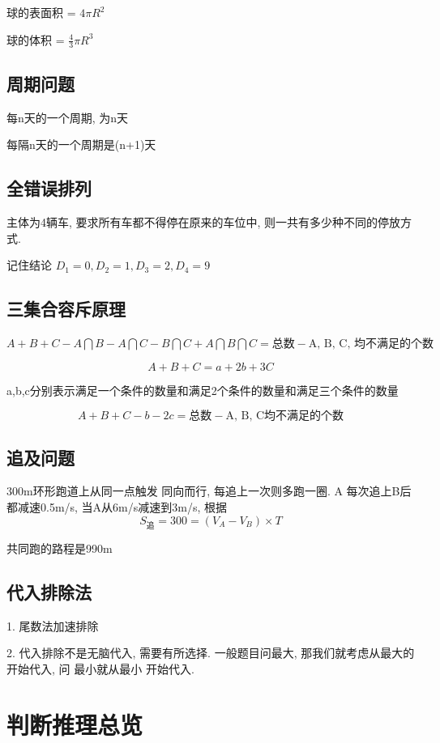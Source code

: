 \documentclass[UTF8]{ctexart}
\begin{document}
球的表面积 = $4\pi R^2$

球的体积 = $\frac{4}{3} \pi R^3$

\subsection{周期问题}
每n天的一个周期, 为n天

每隔n天的一个周期是(n+1)天




\subsection{全错误排列}

主体为4辆车, 要求所有车都不得停在原来的车位中, 则一共有多少种不同的停放方式.

记住结论 $D_1 = 0, D_2 = 1, D_3 = 2, D_4 = 9$


\subsection{三集合容斥原理}

$A + B + C - A\bigcap B - A \bigcap C - B \bigcap C + A \bigcap B \bigcap C = \mbox{总数} - \mbox{A, B, C, 均不满足的个数} $

$$A + B + C = a + 2b + 3C$$

a,b,c分别表示满足一个条件的数量和满足2个条件的数量和满足三个条件的数量

$$
	A + B + C - b - 2c = \mbox{总数} - \mbox{A, B, C均不满足的个数}
$$


\subsection{追及问题}

300m环形跑道上从同一点触发 同向而行, 每追上一次则多跑一圈. A 每次追上B后都减速0.5m/s, 当A从6m/s减速到3m/s,
根据
$$
	S_{追} = 300 = (V_A - V_B) \times T
$$

共同跑的路程是990m

\subsection{代入排除法}
1. 尾数法加速排除

2. 代入排除不是无脑代入, 需要有所选择. 一般题目问最大, 那我们就考虑从最大的开始代入, 问
最小就从最小 开始代入.
\section{判断推理总览}
\end{document}
